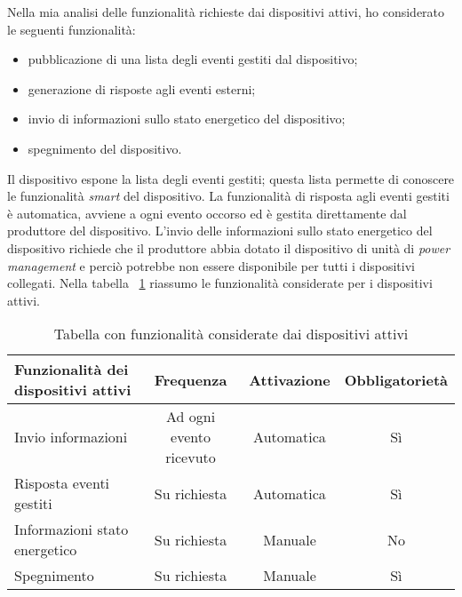 Nella mia analisi delle funzionalità richieste dai dispositivi attivi, ho considerato le seguenti funzionalità:
\begin{itemize}
	\item pubblicazione di una lista degli eventi gestiti dal dispositivo;
	\item generazione di risposte agli eventi esterni;
	\item invio di informazioni sullo stato energetico del dispositivo;
	\item spegnimento del dispositivo.
\end{itemize}

Il dispositivo espone la lista degli eventi gestiti; questa lista permette di conoscere le funzionalità \emph{smart} del dispositivo.
La funzionalità di risposta agli eventi gestiti è automatica, avviene a ogni evento occorso ed è gestita direttamente dal produttore del dispositivo.
L'invio delle informazioni sullo stato energetico del dispositivo richiede che il produttore abbia dotato il dispositivo di unità di \emph{power management} e perciò potrebbe non essere disponibile per tutti i dispositivi collegati.
Nella tabella ~\ref{tab:funz-disp-attivi} riassumo le funzionalità considerate per i dispositivi attivi.

\begin{table}[H]
\caption{Tabella con funzionalità considerate dai dispositivi attivi}
\label{tab:funz-disp-attivi}
\begin{tabularx}{\linewidth}{|X|c|c|c|}
\hline
\textbf{Funzionalità dei dispositivi attivi} & \textbf{Frequenza} & \textbf{Attivazione} & \textbf{Obbligatorietà} \\
\hline
Invio informazioni & Ad ogni evento ricevuto & Automatica & Sì \\
\hline
Risposta eventi gestiti & Su richiesta & Automatica & Sì \\
\hline
Informazioni stato energetico & Su richiesta & Manuale & No \\
\hline
Spegnimento & Su richiesta & Manuale & Sì \\
\hline
\end{tabularx}
\end{table}


